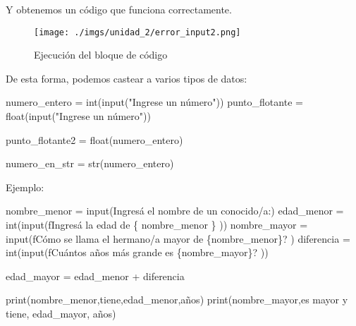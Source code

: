 \documentclass[
  letterpaper,
  DIV=11,
  numbers=noendperiod]{scrreprt}
\newenvironment{Shaded}{\begin{snugshade}}{\end{snugshade}}
\newcommand{\BuiltInTok}[1]{\textcolor[rgb]{0.00,0.23,0.31}{#1}}
\newcommand{\NormalTok}[1]{\textcolor[rgb]{0.00,0.23,0.31}{#1}}
\newcommand{\OperatorTok}[1]{\textcolor[rgb]{0.37,0.37,0.37}{#1}}
\newcommand{\SpecialCharTok}[1]{\textcolor[rgb]{0.37,0.37,0.37}{#1}}
\newcommand{\SpecialStringTok}[1]{\textcolor[rgb]{0.13,0.47,0.30}{#1}}
\newcommand{\StringTok}[1]{\textcolor[rgb]{0.13,0.47,0.30}{#1}}
\begin{document}
Y obtenemos un código que funciona correctamente.

\begin{figure}[H]

{\centering \texttt{[image: ./imgs/unidad\_2/error\_input2.png]}

}

\caption{Ejecución del bloque de código}

\end{figure}%

De esta forma, podemos castear a varios tipos de datos:

\begin{Shaded}
\begin{Highlighting}[]
\NormalTok{numero\_entero }\OperatorTok{=} \BuiltInTok{int}\NormalTok{(}\BuiltInTok{input}\NormalTok{(}\StringTok{"Ingrese un número"}\NormalTok{))}
\NormalTok{punto\_flotante }\OperatorTok{=} \BuiltInTok{float}\NormalTok{(}\BuiltInTok{input}\NormalTok{(}\StringTok{"Ingrese un número"}\NormalTok{))}

\NormalTok{punto\_flotante2 }\OperatorTok{=} \BuiltInTok{float}\NormalTok{(numero\_entero)}

\NormalTok{numero\_en\_str }\OperatorTok{=} \BuiltInTok{str}\NormalTok{(numero\_entero)}
\end{Highlighting}
\end{Shaded}

Ejemplo:

\begin{Shaded}
\begin{Highlighting}[]
\NormalTok{nombre\_menor }\OperatorTok{=} \BuiltInTok{input}\NormalTok{(}\StringTok{\textquotesingle{}Ingresá el nombre de un conocido/a:\textquotesingle{}}\NormalTok{)}
\NormalTok{edad\_menor }\OperatorTok{=} \BuiltInTok{int}\NormalTok{(}\BuiltInTok{input}\NormalTok{(}\SpecialStringTok{f\textquotesingle{}Ingresá la edad de }\SpecialCharTok{\{}\NormalTok{ nombre\_menor }\SpecialCharTok{\}}\SpecialStringTok{ \textquotesingle{}}\NormalTok{))}
\NormalTok{nombre\_mayor }\OperatorTok{=} \BuiltInTok{input}\NormalTok{(}\SpecialStringTok{f\textquotesingle{}Cómo se llama el hermano/a mayor de }\SpecialCharTok{\{}\NormalTok{nombre\_menor}\SpecialCharTok{\}}\SpecialStringTok{? \textquotesingle{}}\NormalTok{)}
\NormalTok{diferencia }\OperatorTok{=} \BuiltInTok{int}\NormalTok{(}\BuiltInTok{input}\NormalTok{(}\SpecialStringTok{f\textquotesingle{}Cuántos años más grande es }\SpecialCharTok{\{}\NormalTok{nombre\_mayor}\SpecialCharTok{\}}\SpecialStringTok{?  \textquotesingle{}}\NormalTok{))}

\NormalTok{edad\_mayor }\OperatorTok{=}\NormalTok{ edad\_menor }\OperatorTok{+}\NormalTok{ diferencia}

\BuiltInTok{print}\NormalTok{(nombre\_menor,}\StringTok{\textquotesingle{}tiene\textquotesingle{}}\NormalTok{,edad\_menor,}\StringTok{\textquotesingle{}años\textquotesingle{}}\NormalTok{)}
\BuiltInTok{print}\NormalTok{(nombre\_mayor,}\StringTok{\textquotesingle{}es mayor y tiene\textquotesingle{}}\NormalTok{, edad\_mayor, }\StringTok{\textquotesingle{}años\textquotesingle{}}\NormalTok{)}
\end{Highlighting}
\end{Shaded}
\end{document}
